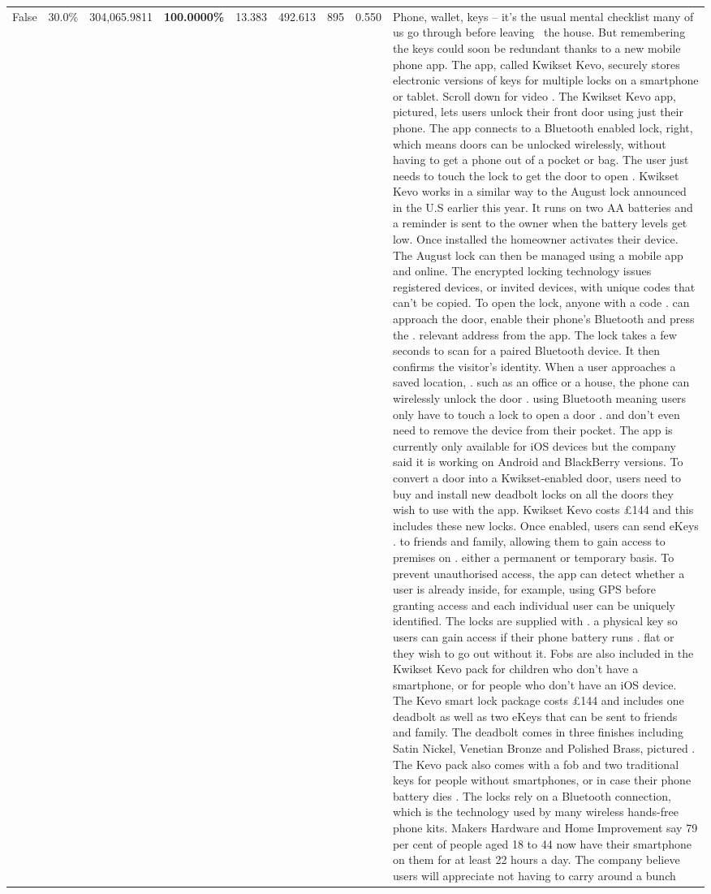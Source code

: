 \begin{table}[H]
\begin{tabular}{lllrlllll}
False & 30.0\% & 304,065.9811 & \bfseries \color{red} 100.0000\% & 13.383 & 492.613 & 895 & 0.550 & Phone, wallet, keys – it’s the usual mental checklist many of us go through before leaving  the house. But remembering the keys could soon be redundant thanks to a new mobile phone app. The app, called Kwikset Kevo, securely stores electronic versions of keys for multiple locks on a smartphone or tablet. Scroll down for video . The Kwikset Kevo app, pictured, lets users unlock their front door using just their phone. The app connects to a Bluetooth enabled lock, right, which means doors can be unlocked wirelessly, without having to get a phone out of a pocket or bag. The user just needs to touch the lock to get the door to open . Kwikset Kevo works in a similar way to the August lock announced in the U.S earlier this year. It runs on two AA batteries and a reminder is sent to the owner when the battery levels get low. Once installed the homeowner activates their device. The August lock can then be managed using a mobile app and online. The encrypted locking technology issues registered devices, or invited devices, with unique codes that can't be copied. To open the lock, anyone with a code . can approach the door, enable their phone's Bluetooth and press the . relevant address from the app. The lock takes a few seconds to scan for a paired Bluetooth device. It then confirms the visitor's identity. When a user approaches a saved location, . such as an office or a house, the phone can wirelessly unlock the door . using Bluetooth meaning users only have to touch a lock to open a door . and don't even need to remove the device from their pocket. The app is currently only available for iOS devices but the company said it is working on Android and BlackBerry versions. To convert a door into a Kwikset-enabled door, users need to buy and install new deadbolt locks on all the doors they wish to use with the app. Kwikset Kevo costs £144 and this includes these new locks. Once enabled, users can send eKeys . to friends and family, allowing them to gain access to premises on . either a permanent or temporary basis. To prevent unauthorised access, the app can detect whether a user is already inside, for example, using GPS before granting access and each individual user can be uniquely identified. The locks are supplied with . a physical key so users can gain access if their phone battery runs . flat or they wish to go out without it. Fobs are also included in the Kwikset Kevo pack for children who don't have a smartphone, or for people who don't have an iOS device. The Kevo smart lock package costs £144 and includes one deadbolt as well as two eKeys that can be sent to friends and family. The deadbolt comes in three finishes including Satin Nickel, Venetian Bronze and Polished Brass, pictured . The Kevo pack also comes with a fob and two traditional keys for people without smartphones, or in case their phone battery dies . The locks rely on a Bluetooth connection, which is the technology used by many wireless hands-free phone kits. Makers Hardware and Home Improvement say 79 per cent of people aged 18 to 44 now have their smartphone on them for at least 22 hours a day. The company believe users will appreciate not having to carry around a bunch 
\end{tabular}
\end{table}
